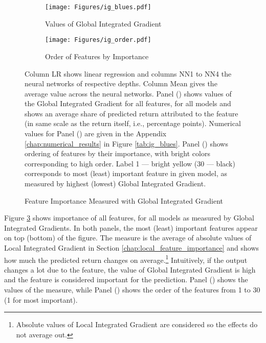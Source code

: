 		\begin{figure}	
			\centering		
			\begin{subfigure}[t]{\textwidth}
				\texttt{[image: Figures/ig\_blues.pdf]}
				\caption{Values of Global Integrated Gradient}
				\label{fig:ig_blues}
			\end{subfigure}
			
			\begin{subfigure}[t]{\textwidth}
				\texttt{[image: Figures/ig\_order.pdf]}
				\caption{Order of Features by Importance}
				\label{fig:ig_order}
			\end{subfigure}
			\caption{Feature Importance Measured with Global Integrated Gradient}
			\medskip
			\small
			Column LR shows linear regression and columns NN1 to NN4 the neural networks of respective depths. Column Mean gives the average value across the neural networks. Panel () shows values of the Global Integrated Gradient for all features, for all models and shows an average share of predicted return attributed to the feature (in same scale as the return itself, i.e., percentage points).  Numerical values for Panel () are given in the Appendix \ref{chap:numerical_results} in Figure \ref{tab:ig_blues}. Panel () shows ordering of features by their importance, with bright colors corresponding to high order. Label 1 --- bright yellow (30 --- black) corresponds to most (least) important feature in given model, as measured by highest (lowest) Global Integrated Gradient. 
			\label{fig:ig_ensemble}
		\end{figure}
	
	
		Figure \ref{fig:ig_ensemble} shows importance of all features, for all models as measured by Global Integrated Gradients.  In both panels, the most (least) important features appear on top (bottom) of the figure. The measure is the average of absolute values of Local Integrated Gradient in Section \ref{chap:local_feature_importance} and shows how much the predicted return changes on average.\footnote{Absolute values of Local Integrated Gradient are considered so the effects do not average out.} Intuitively, if the output changes a lot due to the feature, the value of Global Integrated Gradient is high and the feature is considered important for the prediction. Panel () shows the values of the measure, while Panel () shows the order of the features from 1 to 30 (1 for most important).
		
